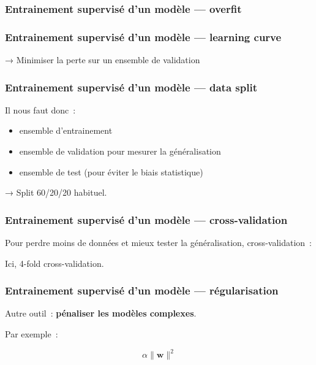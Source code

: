 \documentclass{formation}
\begin{document}
\begin{frame}
  \frametitle{Entrainement supervisé d'un modèle — overfit}


\end{frame}

\begin{frame}
  \frametitle{Entrainement supervisé d'un modèle — learning curve}


  → Minimiser la perte sur un ensemble de validation
\end{frame}

\begin{frame}
  \frametitle{Entrainement supervisé d'un modèle — data split}

  Il nous faut donc :

  \begin{itemize}
  \item ensemble d'entrainement
  \item ensemble de validation pour mesurer la généralisation
  \item ensemble de test (pour éviter le biais statistique)
  \end{itemize}

  → Split 60/20/20 habituel.
\end{frame}

\begin{frame}
  \frametitle{Entrainement supervisé d'un modèle — cross-validation}

  Pour \og perdre\fg{} moins de données et mieux tester la
  généralisation, cross-validation :


  Ici, 4-fold cross-validation.
\end{frame}

\begin{frame}
  \frametitle{Entrainement supervisé d'un modèle — régularisation}

  Autre outil : \textbf{pénaliser les modèles complexes}.

  Par exemple :

  \[
    \alpha\lVert \mathbf{w} \rVert^2
  \]
\end{frame}
\end{document}
